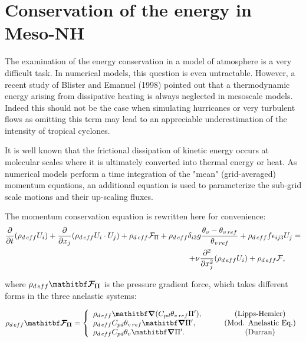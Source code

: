
\section{Conservation of the energy in Meso-NH}

The examination of the energy conservation in a model of atmosphere is a very
difficult task. In numerical models, this question is even untractable. However,
a recent study of Blister and Emanuel (1998) pointed out that a thermodynamic
energy arising from dissipative heating is always neglected in mesoscale
models. Indeed this should not be the case when simulating hurricanes or very turbulent 
flows as omitting this term may lead to an appreciable underestimation of the intensity of 
tropical cyclones.

It is well known that the frictional dissipation of kinetic energy occurs at 
molecular scales where it is ultimately converted into thermal energy or heat.
As numerical models perform a time integration of the "mean" (grid-averaged)
momentum equations, an additional equation is used to parameterize the sub-grid 
scale motions and their up-scaling fluxes. 

The momentum conservation equation is rewritten here for convenience:
\begin{eqnarray}
\label{NewEqMomentum}
\dfrac{\partial}{\partial t}(\rho_{d\,eff} {U_i})
+\dfrac{\partial}{\partial x_j} (\rho_{d\,eff} {U_i} \cdot {U_j} )
+ \rho_{d\,eff} {\cal F}_{\Pi}
+ \rho_{d\,eff}  \delta_{i3} g \dfrac{\theta_v-\theta_{v\,ref}}{\theta_{v\,ref}}
+ \rho_{d\,eff} f \epsilon_{ij3} {U_j} = & \nonumber\\
+ \nu \dfrac{\partial^2}{\partial x_j^2} (\rho_{d\,eff} {U_i}) 
+ \rho_{d\,eff} {\cal F} , \qquad &
\end{eqnarray}

\noindent where $\rho_{d\,eff} \vec{{\cal F}_{\Pi}}$ is the pressure gradient force, which
takes different forms in the three anelastic systems:

%
\parbox{12cm}{
\begin{displaymath}
\rho_{d\,eff} \vec{{\cal F}_{\Pi}} =  \left\{
\begin{array}{l@{\quad}cc}
\rho_{d\,eff}  \vec{ \nabla}(C_{pd} \theta_{v\,ref} \Pi '),
                                        & \quad &\mbox{(Lipps-Hemler)}\\
\rho_{d\,eff} C_{pd} \theta_{v\,ref} \vec{ \nabla} \Pi ',
                                                & \quad &\mbox{(Mod. Anelastic  Eq.)} \\
\rho_{d\,eff} C_{pd} \theta_{v} \vec{ \nabla} \Pi '. & \quad  &\mbox{(Durran)}
\end{array}
\right.
\end{displaymath}
}
\hfill
\parbox{1cm}{
\begin{eqnarray}
\ \label{LhgradP} \\ \label{MAEgradP}   \\ \label{DUgradP}
\end{eqnarray}
}
%

